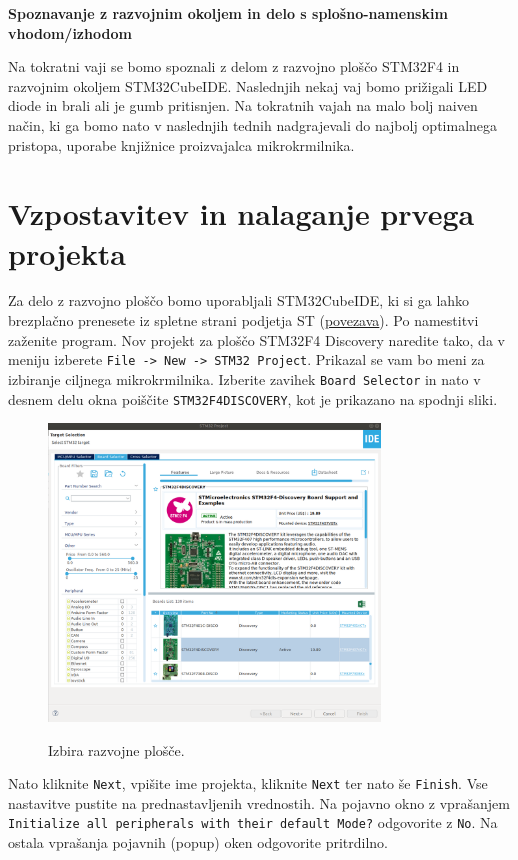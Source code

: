 \documentclass[12pt,letterpaper]{article}
\begin{document}
\begin{center}
    \textbf{\Large Spoznavanje z razvojnim okoljem in delo s splošno-namenskim vhodom/izhodom}   
\end{center}

Na tokratni vaji se bomo spoznali z delom z razvojno ploščo STM32F4 in razvojnim okoljem STM32CubeIDE. Naslednjih nekaj vaj bomo prižigali LED diode in brali ali je gumb pritisnjen. Na tokratnih vajah na malo bolj naiven način, ki ga bomo nato v naslednjih tednih nadgrajevali do najbolj optimalnega pristopa, uporabe knjižnice proizvajalca mikrokrmilnika.


\section*{Vzpostavitev in nalaganje prvega projekta}

Za delo z razvojno ploščo bomo uporabljali STM32CubeIDE, ki si ga lahko brezplačno prenesete iz spletne strani podjetja ST (\href{https://www.st.com/en/development-tools/stm32cubeide.html}{povezava}). Po namestitvi zaženite program. Nov projekt za ploščo STM32F4 Discovery naredite tako, da v meniju izberete \texttt{File -> New -> STM32 Project}. Prikazal se vam bo meni za izbiranje ciljnega mikrokrmilnika. Izberite zavihek \texttt{Board Selector} in nato v desnem delu okna poiščite \texttt{STM32F4DISCOVERY}, kot je prikazano na spodnji sliki.

\begin{figure}[ht!]
  \centering
  \caption{Izbira razvojne plošče.}
  \includegraphics[width=250pt]{vaja2/izbira}
  \label{izbira}
\end{figure}

Nato kliknite \texttt{Next}, vpišite ime projekta, kliknite \texttt{Next} ter nato še \texttt{Finish}. Vse nastavitve pustite na prednastavljenih vrednostih. Na pojavno okno z vprašanjem \texttt{Initialize all peripherals with their default Mode?} odgovorite z \texttt{No}. Na ostala vprašanja pojavnih (popup) oken odgovorite pritrdilno.
\end{document}
